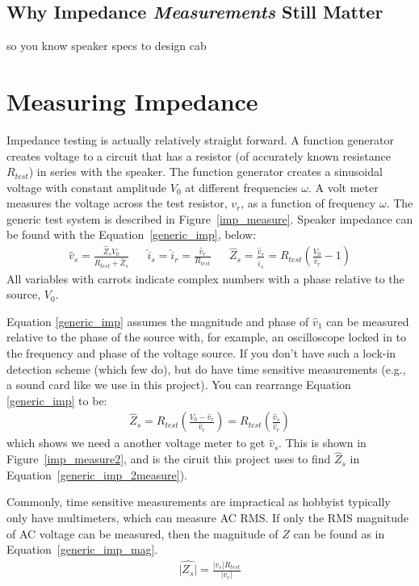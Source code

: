 \documentclass[10pt]{book}
\begin{document}
\subsection{Why Impedance \textit{Measurements} Still Matter}
so you know speaker specs to design cab

\section{Measuring Impedance}
Impedance testing is actually relatively straight forward. A function generator creates voltage to a circuit that has a resistor (of accurately known resistance $R_{test}$) in series with the speaker. The function generator creates a sinusoidal voltage with constant amplitude $V_0$ at different frequencies $\omega$. A volt meter measures the voltage across the test resistor, $v_r$, as a function of frequency $\omega$. The generic test system is described in Figure~\ref{imp_measure}. Speaker impedance can be found with the Equation~\ref{generic_imp}, below:
\begin{align}\label{generic_imp}
\hat{v}_s=\frac{ \hat{Z}_s V_0 }{ R_{test} + \hat{Z}_s } && \hat{i}_s=\hat{i}_r=\frac{\hat{v}_r}{R_{test}} && \hat{Z}_s=\frac{\hat{v}_s}{\hat{i}_s}=R_{test}\left( \frac{V_0}{\hat{v}_r} -1 \right)
\end{align}
All variables with carrots indicate complex numbers with a phase relative to the source, $V_0$.

Equation \ref{generic_imp} assumes the magnitude and phase of  $\hat{v}_1$ can be measured relative to the phase of the source with, for example, an oscilloscope locked in to the frequency and phase of the voltage source. If you don't have such a lock-in detection scheme (which few do), but do have time sensitive measurements (e.g., a sound card like we use in this project). You can rearrange Equation \ref{generic_imp} to be:
\begin{align}\label{generic_imp_2measure}
\hat{Z}_s=R_{test}\left( \frac{V_0 - \hat{v}_r}{\hat{v}_r}\right)=R_{test}\left( \frac{\hat{v}_s}{\hat{v}_r}\right)
\end{align}
which shows we need a another voltage meter to get $\hat{v}_s$. This is shown in Figure~\ref{imp_measure2}, and is the ciruit this project uses to find $\hat{Z}_s$ in Equation~\ref{generic_imp_2measure}).



Commonly, time sensitive measurements are impractical as hobbyist typically only have multimeters, which can measure AC RMS. If only the RMS magnitude of AC voltage can be measured, then the magnitude of $Z$ can be found as in Equation~\ref{generic_imp_mag}.
\begin{align}\label{generic_imp_mag}
\hat{\left|Z_s\right|}=\frac{\left| v_s \right| R_{test}}{\left| v_r \right|}
\end{align}
\end{document}
